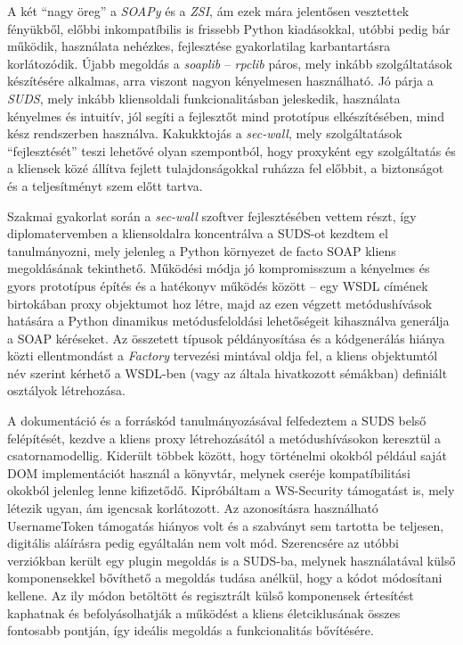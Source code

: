 A két ``nagy öreg'' a \emph{SOAPy} és a \emph{ZSI}, ám ezek mára jelentősen vesztettek fényükből, előbbi inkompatíbilis is frissebb Python kiadásokkal, utóbbi pedig bár működik, használata nehézkes, fejlesztése gyakorlatilag karbantartásra korlátozódik. Újabb megoldás a \emph{soaplib} -- \emph{rpclib} páros, mely inkább szolgáltatások készítésére alkalmas, arra viszont nagyon kényelmesen használható. Jó párja a \emph{SUDS}, mely inkább kliensoldali funkcionalitásban jeleskedik, használata kényelmes és intuitív, jól segíti a fejlesztőt mind prototípus elkészítésében, mind kész rendszerben használva. Kakukktojás a \emph{sec-wall}, mely szolgáltatások ``fejlesztését'' teszi lehetővé olyan szempontból, hogy proxyként egy szolgáltatás és a kliensek közé állítva fejlett tulajdonságokkal ruházza fel előbbit, a biztonságot és a teljesítményt szem előtt tartva.

\bigskip

Szakmai gyakorlat során a \emph{sec-wall} szoftver fejlesztésében vettem részt, így diplomatervemben a kliensoldalra koncentrálva a SUDS-ot kezdtem el tanulmányozni, mely jelenleg a Python környezet de facto SOAP kliens megoldásának tekinthető. Működési módja jó kompromisszum a kényelmes és gyors prototípus építés és a hatékonyv működés között -- egy WSDL címének birtokában proxy objektumot hoz létre, majd az ezen végzett metódushívások hatására a Python dinamikus metódusfeloldási lehetőségeit kihasználva generálja a SOAP kéréseket. Az összetett típusok példányosítása és a kódgenerálás hiánya közti ellentmondást a \emph{Factory} tervezési mintával oldja fel, a kliens objektumtól név szerint kérhető a WSDL-ben (vagy az általa hivatkozott sémákban) definiált osztályok létrehozása.

A dokumentáció és a forráskód tanulmányozásával felfedeztem a SUDS belső felépítését, kezdve a kliens proxy létrehozásától a metódushívásokon keresztül a csatornamodellig. Kiderült többek között, hogy történelmi okokból például saját DOM implementációt használ a könyvtár, melynek cseréje kompatíbilitási okokból jelenleg lenne kifizetődő. Kipróbáltam a WS\hyp{}Security támogatást is, mely létezik ugyan, ám igencsak korlátozott. Az azonosításra használható UsernameToken támogatás hiányos volt és a szabványt sem tartotta be teljesen, digitális aláírásra pedig egyáltalán nem volt mód. Szerencsére az utóbbi verziókban került egy plugin megoldás is a SUDS-ba, melynek használatával külső komponensekkel bővíthető a megoldás tudása anélkül, hogy a kódot módosítani kellene. Az ily módon betöltött és regisztrált külső komponensek értesítést kaphatnak és befolyásolhatják a működést a kliens életciklusának összes fontosabb pontján, így ideális megoldás a funkcionalitás bővítésére.

